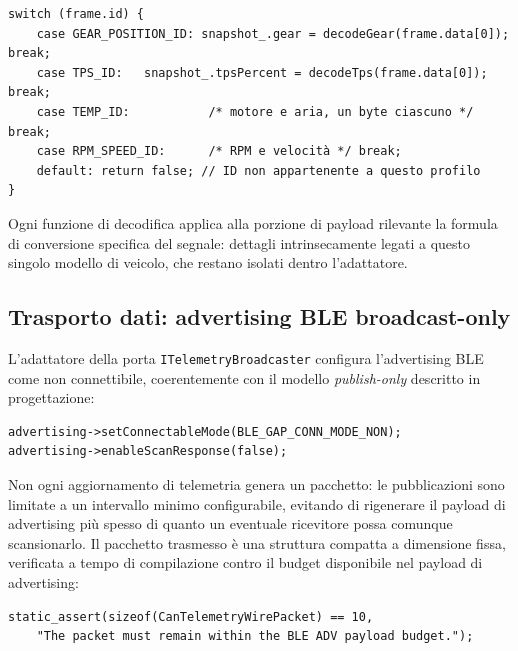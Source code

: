 \begin{listing}[H]
\begin{verbatim}
switch (frame.id) {
    case GEAR_POSITION_ID: snapshot_.gear = decodeGear(frame.data[0]); break;
    case TPS_ID:   snapshot_.tpsPercent = decodeTps(frame.data[0]); break;
    case TEMP_ID:           /* motore e aria, un byte ciascuno */ break;
    case RPM_SPEED_ID:      /* RPM e velocità */ break;
    default: return false; // ID non appartenente a questo profilo
}
\end{verbatim}
\caption{Instradamento dei frame per identificativo nel profilo Yamaha MT-07 (semplificato)}
\label{listing:vehicle-profile-decode}
\end{listing}

Ogni funzione di decodifica applica alla porzione di payload rilevante la
formula di conversione specifica del segnale: dettagli intrinsecamente
legati a questo singolo modello di veicolo, che restano isolati dentro
l'adattatore.

\subsection{Trasporto dati: advertising BLE broadcast-only}
L'adattatore della porta \texttt{ITelemetryBroadcaster} configura
l'advertising BLE come non connettibile, coerentemente con il modello
\emph{publish-only} descritto in progettazione:

\begin{listing}[H]
\begin{verbatim}
advertising->setConnectableMode(BLE_GAP_CONN_MODE_NON);
advertising->enableScanResponse(false);
\end{verbatim}
\caption{Configurazione dell'advertising come non connettibile}
\label{listing:ble-non-connectable}
\end{listing}

Non ogni aggiornamento di telemetria genera un pacchetto: le pubblicazioni
sono limitate a un intervallo minimo configurabile, evitando di rigenerare
il payload di advertising più spesso di quanto un eventuale ricevitore possa
comunque scansionarlo. Il pacchetto trasmesso è una struttura compatta a
dimensione fissa, verificata a tempo di compilazione contro il budget
disponibile nel payload di advertising:

\begin{listing}[H]
\begin{verbatim}
static_assert(sizeof(CanTelemetryWirePacket) == 10,
    "The packet must remain within the BLE ADV payload budget.");
\end{verbatim}
\caption{Verifica statica della dimensione del pacchetto trasmesso}
\label{listing:wire-packet-assert}
\end{listing}

